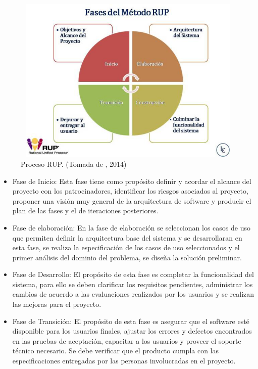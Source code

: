 \begin{figure}[H]
\begin{center}
	\includegraphics[width=13cm,height=8cm]{img/fases-rup.jpg}
\end{center}
\caption{Proceso RUP. (Tomada de , 2014)}
\label{fig:Rup}
\end{figure}



\begin{itemize}

    \item Fase de Inicio: Esta fase tiene como propósito definir y acordar el alcance del proyecto con los patrocinadores, identificar los riesgos asociados al proyecto, proponer una visión muy general de la arquitectura de software y producir el plan de las fases y el de iteraciones posteriores.

	\item Fase de elaboración: En la fase de elaboración se seleccionan los casos de uso que permiten definir la arquitectura base del sistema y se desarrollaran en esta fase, se realiza la especificación de los casos de uso seleccionados y el primer análisis del dominio del problema, se diseña la solución preliminar.

	\item Fase de Desarrollo: El propósito de esta fase es completar la funcionalidad del sistema, para ello se deben clarificar los requisitos pendientes, administrar los cambios de acuerdo a las evaluaciones realizados por los usuarios y se realizan las mejoras para el proyecto.

	\item Fase de Transición: El propósito de esta fase es asegurar que el software esté disponible para los usuarios finales, ajustar los errores y defectos encontrados en las pruebas de aceptación, capacitar a los usuarios y proveer el soporte técnico necesario. Se debe verificar que el producto cumpla con las especificaciones entregadas por las personas involucradas en el proyecto.	

\end{itemize}

